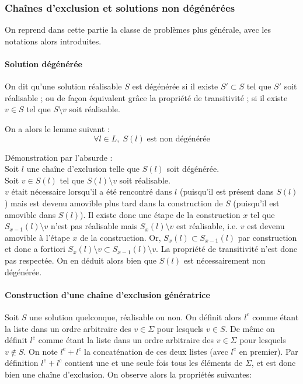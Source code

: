 \documentclass[12pt,a4paper]{article}
\begin{document}
\subsubsection{Chaînes d'exclusion et solutions non dégénérées}

On reprend dans cette partie la classe de problèmes plus générale, avec les notations alors introduites.

 \paragraph{Solution dégénérée}
 
On dit qu'une solution réalisable $S$ est dégénérée si il existe $S'\subset S$ tel que $S'$ soit réalisable ; ou de façon équivalent grâce la propriété de transitivité ; si il existe $v\in S$ tel que $S\setminus v$ soit réalisable.

On a alors le lemme suivant :
\[\forall l\in L,\; S(l)\;\text{est non dégénérée}\]

Démonstration par l'absurde : 
\\Soit $l$ une chaîne d'exclusion telle que $S(l)$ soit dégénérée. 
\\Soit $v\in S(l)$ tel que $S(l)\setminus v$ soit réalisable.
\\$v$ était nécessaire lorsqu'il a été rencontré dans $l$ (puisqu'il est présent dans $S(l)$) mais est devenu amovible plus tard dans la construction de $S$ (puisqu'il est amovible dans $S(l)$). Il existe donc une étape de la construction $x$ tel que $S_{x-1}(l)\setminus v$ n'est pas réalisable mais $S_x(l)\setminus v$ est réalisable, i.e. $v$ est devenu amovible à l'étape $x$ de la construction. Or, $S_x(l)\subset S_{x-1}(l)$ par construction et donc a fortiori $S_x(l)\setminus v \subset S_{x-1}(l)\setminus v$. La propriété de transitivité n'est donc pas respectée.
On en déduit alors bien que $S(l)$ est nécessairement non dégénérée.

\paragraph{Construction d'une chaîne d'exclusion génératrice}
Soit $S$ une solution quelconque, réalisable ou non. On définit alors $l^c$ comme étant la liste dans un ordre arbitraire des  $v\in \Sigma$ pour lesquels $v\in S$. De même on définit $l^e$ comme étant la liste dans un ordre arbitraire des $v\in \Sigma$ pour lesquels $v\notin S$. On note $l^e+l^c$ la concaténation de ces deux listes (avec $l^e$ en premier). Par définition $l^e+l^c$ contient une et une seule fois tous les éléments de $\Sigma$, et est donc bien une chaîne d'exclusion. On observe alors la propriétés suivantes:
\end{document}
